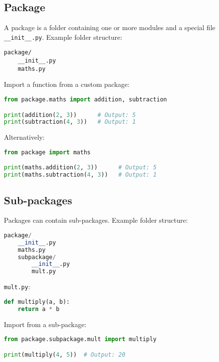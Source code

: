 \subsection{Package}
A package is a folder containing one or more modules and a special file \texttt{\_\_init\_\_.py}.  
Example folder structure:
\begin{verbatim}
package/
    __init__.py
    maths.py
\end{verbatim}

Import a function from a custom package:

\begin{lstlisting}[language=Python]
from package.maths import addition, subtraction

print(addition(2, 3))      # Output: 5
print(subtraction(4, 3))   # Output: 1
\end{lstlisting}

Alternatively:

\begin{lstlisting}[language=Python]
from package import maths

print(maths.addition(2, 3))      # Output: 5
print(maths.subtraction(4, 3))   # Output: 1
\end{lstlisting}

\subsection{Sub-packages}
Packages can contain sub-packages. Example folder structure:

\begin{lstlisting}[language=Python]
package/
    __init__.py
    maths.py
    subpackage/
        __init__.py
        mult.py
\end{lstlisting}


\texttt{mult.py}:

\begin{lstlisting}[language=Python]
def multiply(a, b):
    return a * b
\end{lstlisting}

Import from a sub-package:

\begin{lstlisting}[language=Python]
from package.subpackage.mult import multiply

print(multiply(4, 5))  # Output: 20
\end{lstlisting}

